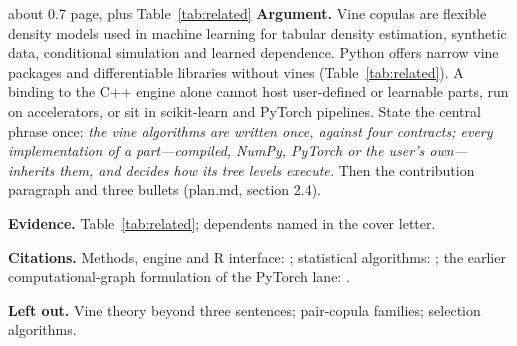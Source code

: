 \documentclass[twoside,11pt]{article}
\begin{document}
\begin{plan}{about 0.7 page, plus Table~\ref{tab:related}}
\textbf{Argument.} Vine copulas \citep{bedford2002vines,aas2009pair} are
flexible density models used in machine learning for tabular density
estimation, synthetic data, conditional simulation and learned dependence.
Python offers narrow vine packages and differentiable libraries without vines
(Table~\ref{tab:related}). A binding to the C++ engine alone cannot host
user-defined or learnable parts, run on accelerators, or sit in scikit-learn
and PyTorch pipelines. State the central phrase once: \emph{the vine
algorithms are written once, against four contracts; every implementation of
a part---compiled, NumPy, PyTorch or the user's own---inherits them, and
decides how its tree levels execute.} Then the contribution paragraph and
three bullets (plan.md, section 2.4).

\textbf{Evidence.} Table~\ref{tab:related}; dependents named in the cover
letter.

\textbf{Citations.} Methods, engine and R interface:
\citet{nagler2026rvinecopulib}; statistical algorithms:
\citet{nagler2026algorithms}; the earlier computational-graph formulation of
the PyTorch lane: \citet{cheng2025vine}.

\textbf{Left out.} Vine theory beyond three sentences; pair-copula families;
selection algorithms.
\end{plan}
\end{document}
